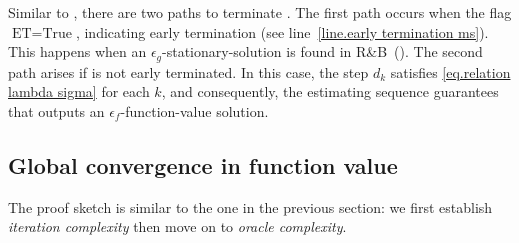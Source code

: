\documentclass[moor,sglanonrev]{informs4}
\begin{document}
Similar to , there are two paths to terminate . The first path occurs when the flag $\textrm{ET} = \text{True}$, indicating early termination (see line~\ref{line.early termination ms}). This happens when an $\epsilon_g$-stationary-solution is found in R\&B~().
The second path arises if  is not early terminated. In this case, the step $d_k$ satisfies \eqref{eq.relation lambda sigma} for each $k$, and consequently, the estimating sequence guarantees that  outputs an $\epsilon_f$-function-value solution.
\subsection{Global convergence in function value}
The proof sketch is similar to the one in the previous section: we first establish \textit{iteration complexity} then move on to \textit{oracle complexity}.
\end{document}
